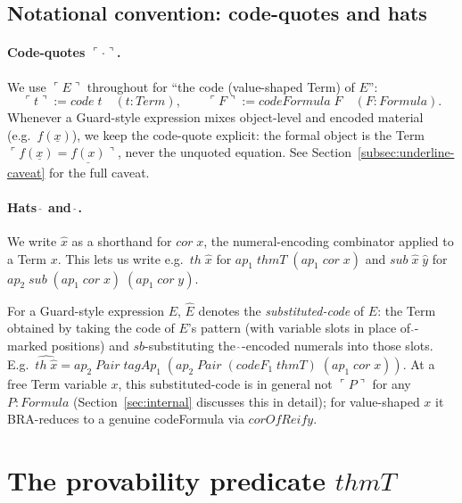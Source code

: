 \documentclass[11pt]{article}
\begin{document}
\subsection{Notational convention: code-quotes and hats}
\label{subsec:codequote}

\paragraph{Code-quotes $\ulcorner \cdot \urcorner$.}
We use $\ulcorner E \urcorner$ throughout for ``the code (value-shaped
Term) of $E$'':
\[
  \ulcorner t \urcorner := \mathit{code}\;t \quad (t : \mathit{Term}), \qquad
  \ulcorner F \urcorner := \mathit{codeFormula}\;F \quad (F : \mathit{Formula}).
\]
Whenever a Guard-style expression mixes object-level and encoded
material (e.g.\ $f(\underline{x})$), we keep the code-quote explicit:
the formal object is the Term $\ulcorner f(\underline{x}) =
\underline{f(x)}\urcorner$, never the unquoted equation.  See
Section~\ref{subsec:underline-caveat} for the full caveat.

\paragraph{Hats $\hat\,$ and $\widehat{\,}$.}
We write $\hat x$ as a shorthand for $\mathit{cor}\;x$, the
numeral-encoding combinator applied to a Term $x$.  This lets us write
e.g.\ $\mathit{th}\;\hat x$ for $\mathit{ap}_1\;\mathit{thmT}\;(\mathit{ap}_1\;\mathit{cor}\;x)$
and $\mathit{sub}\;\hat x\;\hat y$ for $\mathit{ap}_2\;\mathit{sub}\;
(\mathit{ap}_1\;\mathit{cor}\;x)\;(\mathit{ap}_1\;\mathit{cor}\;y)$.

For a Guard-style expression $E$, $\widehat{E}$ denotes the
\emph{substituted-code} of $E$: the Term obtained by taking the code
of $E$'s pattern (with variable slots in place of $\hat{}$-marked
positions) and $\mathit{sb}$-substituting the $\hat\,$-encoded numerals
into those slots.  E.g.\ $\widehat{\mathit{th}\;\hat x} =
\mathit{ap}_2\;\mathit{Pair}\;\mathit{tagAp}_1\;
(\mathit{ap}_2\;\mathit{Pair}\;(\mathit{codeF}_1\;\mathit{thmT})\;
(\mathit{ap}_1\;\mathit{cor}\;x))$.  At a free Term variable $x$, this
substituted-code is in general not $\ulcorner P\urcorner$ for any
$P : \mathit{Formula}$ (Section~\ref{sec:internal} discusses this in
detail); for value-shaped $x$ it BRA-reduces to a genuine
codeFormula via $\mathit{corOfReify}$.

\section{The provability predicate $\mathit{thmT}$}
\label{sec:thmT}
\end{document}
